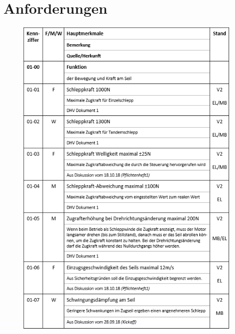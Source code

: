 
\section{Anforderungen}\label{appsec:Anforderungen}
\begin{figure}[H]
	\begin{center}
		\includegraphics[width=155mm]{appendix/Anforderungen1.png}
	\end{center}
\end{figure}

